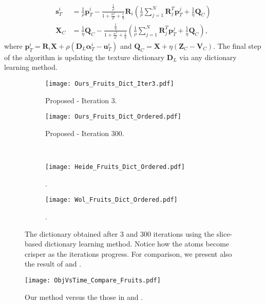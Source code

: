 \documentclass[10pt,twocolumn,letterpaper]{article}
\def\p{{\mathbf p}}
\def\s{{\mathbf s}}
\def\X{{\mathbf X}}
\def\u{ \mathbf{u}}
\def\Z{{\mathbf Z}}
\def\u{{\mathbf u}}
\def\Q{{\mathbf Q}}
\def\D{{\mathbf D}}
\def\R{{\mathbf R}}
\def\V{{\mathbf V}}
\def\alfa{{\boldsymbol \alpha}}
\begin{document}
\begin{align}
\s_T^i & = \frac{1}{\rho} \p_T^i - \frac{ \frac{1}{\rho} }{ 1 + \frac{n^2}{\rho} + \frac{1}{\eta} } \R_i \left( \frac{1}{\rho} \sum_{j=1}^N \R_j^T \p_T^j + \frac{1}{\eta} \Q_C \right) \\
\X_C & = \frac{1}{\eta} \Q_C - \frac{ \frac{1}{\eta} }{ 1 + \frac{n^2}{\rho} + \frac{1}{\eta} } \left( \frac{1}{\rho} \sum_{j=1}^N \R_j^T \p_T^j + \frac{1}{\eta} \Q_C \right),
\end{align}
where
$\p_T^i = \R_i \X + \rho \left( \D_L \alfa_T^i - \u_T^i \right)$ and $\Q_C = \X + \eta \left( \Z_C - \V_C \right)$. The final step of the algorithm is updating the texture dictionary $\D_L$ via any dictionary learning method.

\begin{figure}[b]
	\centering
	\begin{subfigure}{0.205\textwidth}
		\centering
		\texttt{[image: Ours\_Fruits\_Dict\_Iter3.pdf]}
		\caption{Proposed - Iteration 3.}
	\end{subfigure}
	\begin{subfigure}{0.205\textwidth}
		\centering
		\texttt{[image: Ours\_Fruits\_Dict\_Ordered.pdf]}
		\caption{Proposed - Iteration 300.}
	\end{subfigure}
	\\[0.1cm]
	\begin{subfigure}{0.205\textwidth}
		\centering
		\texttt{[image: Heide\_Fruits\_Dict\_Ordered.pdf]}
		\caption{\cite{Heide2015}.}
	\end{subfigure}
	\begin{subfigure}{0.205\textwidth}
		\centering
		\texttt{[image: Wol\_Fruits\_Dict\_Ordered.pdf]}
		\caption{\cite{wohlberg2016boundary}.}
	\end{subfigure}
	\caption{The dictionary obtained after 3 and 300 iterations using the slice-based dictionary learning method. Notice how the atoms become crisper as the iterations progress. For comparison, we present also the result of \cite{Heide2015} and \cite{wohlberg2016boundary}.}
	\label{Fig:single_layer_dictionary}
\end{figure}

\begin{figure}[b]
	\centering
	\texttt{[image: ObjVsTime\_Compare\_Fruits.pdf]}
	\caption{Our method versus the those in \cite{Heide2015} and \cite{wohlberg2016boundary}.}
	\label{Fig:single_layer_obj_vs_time}
\end{figure}
\end{document}
